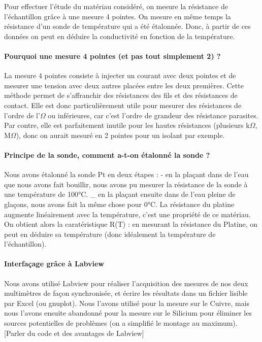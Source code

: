Pour effectuer l'étude du matériau considéré, on mesure la résistance de l'échantillon grâce à une mesure 4 pointes.
On mesure en même temps la résistance d'un sonde de température qui a été étalonnée.
Donc, à partir de ces données on peut en déduire la conductivité en fonction de la température.

\paragraph{Pourquoi une mesure 4 pointes (et pas tout simplement 2) ?}
La mesure 4 pointes consiste à injecter un courant avec deux pointes et de mesurer une tension avec deux autres placées entre les deux premières.
Cette méthode permet de s'affranchir des résistances des fils et des résistances de contact.
Elle est donc particulièrement utile pour mesurer des résistances de l'ordre de l'$\Omega$ ou inférieures, car c'est l'ordre de grandeur des résistance parasites.
Par contre, elle est parfaitement inutile pour les hautes résistances (plusieurs k$\Omega$, M$\Omega$), donc on aurait mesuré en 2 pointes pour un isolant par exemple.

\paragraph{Principe de la sonde, comment a-t-on étalonné la sonde ?}
Nous avons étalonné la sonde Pt en deux étapes :
    - en la plaçant dans de l'eau que nous avons fait bouillir, nous avons pu mesurer la résistance de la sonde à une température de 100°C.
    _ en la plaçant ensuite dans de l'eau pleine de glaçons, nous avons fait la même chose pour 0°C.
La résistance du platine augmente linéairement avec la température, c'est une propriété de ce matériau.
On obtient alors la caratéristique R(T) : en mesurant la résistance du Platine, on peut en déduire sa température (donc idéalement la température de l'échantillon).

\paragraph{Interfaçage grâce à Labview}
Nous avons utilisé Labview pour réaliser l'acquisition des mesures de nos deux multimètres de façon synchronisée, et écrire les résultats dans un fichier lisible par Excel (ou gnuplot).
Nous l'avons utilisé pour la mesure sur le Cuivre, mais nous l'avons ensuite abandonné pour la mesure sur le Silicium pour éliminer les sources potentielles de problèmes (on a simplifié le montage au maximum).
[Parler du code et des avantages de Labview]
